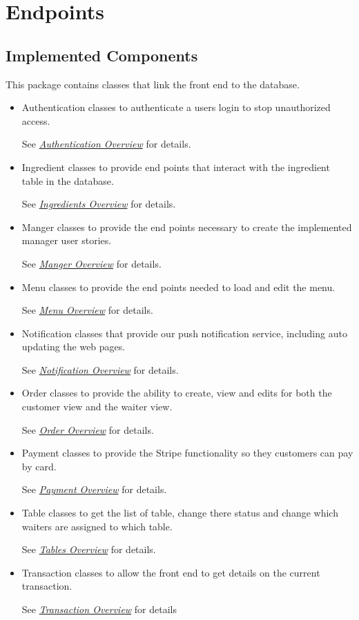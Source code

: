 \documentclass[12pt, twoside, a4paper]{report}
\begin{document}
\section*{Endpoints}\label{sec:endpoints}
\subsection*{Implemented Components}
This package contains classes that link the front end to the database.
\begin{itemize}
  \item Authentication classes to authenticate a users login to stop unauthorized access. 

    See \textit{\href{run:../JavaDoc/endpoints/authentication/package-summary.html}{Authentication Overview}} for details.
  \item Ingredient classes to provide end points that interact with the ingredient table in the database.

    See \textit{\href{run:../JavaDoc/endpoints/ingredient/package-summary.html}{Ingredients Overview}} for details.
  \item Manger classes to provide the end points necessary to create the implemented manager user stories.

    See \textit{\href{run:../JavaDoc/endpoints/manager/package-summary.html}{Manger Overview}} for details.
  \item Menu classes to provide the end points needed to load and edit the menu.

    See \textit{\href{run:../JavaDoc/endpoints/menu/package-summary.html}{Menu Overview}} for details.
  \item Notification classes that provide our push notification service, including auto updating the web pages.

    See \textit{\href{run:../JavaDoc/endpoints/notification/package-summary.html}{Notification Overview}} for details.
  \item Order classes to provide the ability to create, view and edits for both the customer view and the waiter view.

    See \textit{\href{run:../JavaDoc/endpoints/order/package-summary.html}{Order Overview}} for details.
  \item Payment classes to provide the Stripe functionality so they customers can pay by card.

    See \textit{\href{run:../JavaDoc/endpoints/payment/package-summary.html}{Payment Overview}} for details.
  \item Table classes to get the list of table, change there status and change which waiters are assigned to which table.

    See \textit{\href{run:../JavaDoc/endpoints/tables/package-summary.html}{Tables Overview}} for details.
  \item Transaction classes to allow the front end to get details on the current transaction.

    See \textit{\href{run:../JavaDoc/endpoints/transaction/package-summary.html}{Transaction Overview}} for details
\end{itemize}
\end{document}
